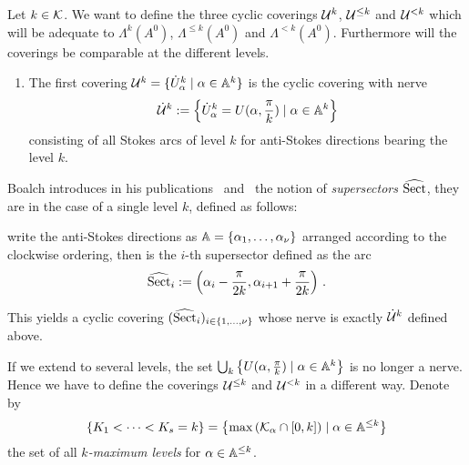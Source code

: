 Let $k\in\mathcal{K}$.
We want to define the three cyclic coverings $\mathcal{U}^{k}$, $\mathcal{U}^{\leq k}$ and
$\mathcal{U}^{<k}$ which will be adequate to $\Lambda^k(A^0)$, $\Lambda^{\leq k}(A^0)$
and $\Lambda^{<k}(A^0)$. Furthermore will the coverings be comparable at the
different levels.

\begin{enumerate}
  \item The first covering $\mathcal{U}^{k}=\{\dot U_\alpha^k\mid\alpha\in\mathbb{A}^k\}$
    is the cyclic covering with nerve
    \[
      \dot{\mathcal{U}}^k:=
      \left\{\dot U_\alpha^k=U(\alpha,\frac{\pi}{k})\mid\alpha\in\mathbb{A}^k\right\}
    \]
    consisting of all Stokes arcs of level $k$ for anti-Stokes directions
    bearing the level $k$.
\end{enumerate}

\begin{rem}
  Boalch introduces in his publications~\cite[19]{boalch}
  and~\cite[Def.1.23]{thboalch} the notion of \emph{supersectors} $\widehat{\operatorname{Sect}}$,
  they are in the case of a single level $k$, defined as follows:
  \begin{einr}
    write the anti-Stokes directions as $\mathbb{A}=\{\alpha_1,\dots,\alpha_\nu\}$
    arranged according to the clockwise ordering, then is the $i$-th
    supersector defined as the arc
    \[
      \widehat{\operatorname{Sect}}_i:=
        \left(\alpha_i-\frac{\pi}{2k},\alpha_{i+1}+\frac{\pi}{2k}\right) \,.
    \]
  \end{einr}
  This yields a cyclic covering $(\widehat{\operatorname{Sect}}_i)_{i\in\{1,\dots,\nu\}}$ whose
  nerve is exactly $\dot{\mathcal{U}}^k$ defined above.
\end{rem}
If we extend to several levels, the set
$\bigcup_k\left\{U(\alpha,\frac{\pi}{k})\mid\alpha\in\mathbb{A}^{k}\right\}$ is no
longer a nerve.
Hence we have to define the coverings $\mathcal{U}^{\leq k}$ and $\mathcal{U}^{<k}$ in a
different way.
Denote by
\[
  \left\{K_1<\cdots<K_s=k\right\}
  =\left\{\max\left(\mathcal{K}_\alpha\cap[0,k]\right)\mid\alpha\in\mathbb{A}^{\leq k}\right\}
\]
the set of all \emph{$k$-maximum levels} for $\alpha\in\mathbb{A}^{\leq k}$.
